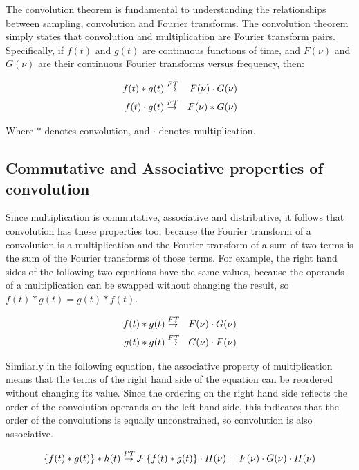 \documentclass[12pt,twoside,a4paper]{article}
\newcommand{\ft}{\mathcal{F}}
\newcommand{\ftarrow}{\stackrel{\mbox{\scriptsize\it FT}}{\rightarrow}}
\begin{document}
The convolution theorem is fundamental to understanding the
relationships between sampling, convolution and Fourier
transforms. The convolution theorem simply states that convolution and
multiplication are Fourier transform pairs. Specifically, if $f(t)$
and $g(t)$ are continuous functions of time, and $F(\nu)$ and $G(\nu)$
are their continuous Fourier transforms versus frequency, then:

\begin{eqnarray}
f(t)\ast g(t) &\ftarrow& F(\nu)\cdot G(\nu) \\
f(t)\cdot g(t) &\ftarrow& F(\nu)\ast G(\nu)
\end{eqnarray}

Where $\ast$ denotes convolution, and $\cdot$ denotes multiplication.

\subsection{Commutative and Associative properties of convolution}

Since multiplication is commutative, associative and distributive, it
follows that convolution has these properties too, because the Fourier
transform of a convolution is a multiplication and the Fourier
transform of a sum of two terms is the sum of the Fourier transforms
of those terms. For example, the right hand sides of the following two
equations have the same values, because the operands of a
multiplication can be swapped without changing the result, so
$f(t)\ast g(t) = g(t) \ast f(t)$.

\begin{eqnarray}
f(t)\ast g(t) &\ftarrow& F(\nu) \cdot G(\nu) \\
g(t)\ast g(t) &\ftarrow& G(\nu) \cdot F(\nu)
\end{eqnarray}

Similarly in the following equation, the associative property of
multiplication means that the terms of the right hand side of the
equation can be reordered without changing its value. Since the
ordering on the right hand side reflects the order of the convolution
operands on the left hand side, this indicates that the order of the
convolutions is equally unconstrained, so convolution is also
associative.

\begin{eqnarray}
\{f(t) \ast g(t)\} \ast h(t) \ftarrow \ft\left\{f(t) \ast g(t)\right\}
\cdot H(\nu) = F(\nu) \cdot G(\nu) \cdot H(\nu)
\end{eqnarray}
\end{document}
